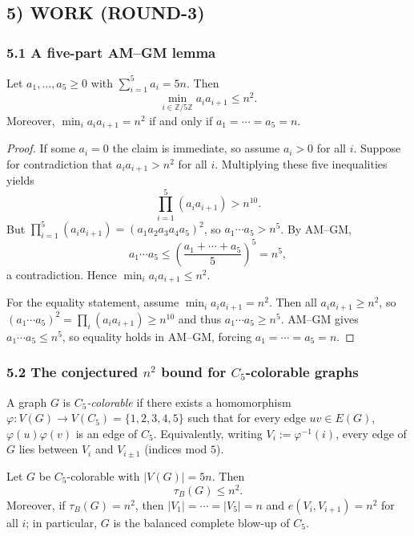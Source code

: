 \subsection*{5) WORK (ROUND-3)}

\subsubsection*{5.1 A five-part AM--GM lemma}
\begin{lemma}\label{lem:adjprod}
Let $a_1,\dots,a_5\ge 0$ with $\sum_{i=1}^5 a_i=5n$. Then
\[
\min_{i\in \mathbb Z/5\mathbb Z} a_i a_{i+1} \le n^2.
\]
Moreover, $\min_i a_i a_{i+1}=n^2$ if and only if $a_1=\cdots=a_5=n$.
\end{lemma}

\begin{proof}
If some $a_i=0$ the claim is immediate, so assume $a_i>0$ for all $i$.
Suppose for contradiction that $a_i a_{i+1}>n^2$ for all $i$.
Multiplying these five inequalities yields
\[
\prod_{i=1}^5 (a_i a_{i+1})>n^{10}.
\]
But $\prod_{i=1}^5 (a_i a_{i+1})=(a_1a_2a_3a_4a_5)^2$, so $a_1\cdots a_5>n^5$.
By AM--GM,
\[
a_1\cdots a_5 \le \left(\frac{a_1+\cdots+a_5}{5}\right)^5=n^5,
\]
a contradiction. Hence $\min_i a_i a_{i+1}\le n^2$.

For the equality statement, assume $\min_i a_i a_{i+1}=n^2$.
Then all $a_i a_{i+1}\ge n^2$, so
$(a_1\cdots a_5)^2=\prod_i (a_i a_{i+1})\ge n^{10}$ and thus $a_1\cdots a_5\ge n^5$.
AM--GM gives $a_1\cdots a_5\le n^5$, so equality holds in AM--GM,
forcing $a_1=\cdots=a_5=n$.
\end{proof}

\subsubsection*{5.2 The conjectured $n^2$ bound for $C_5$-colorable graphs}
\begin{definition}
A graph $G$ is \emph{$C_5$-colorable} if there exists a homomorphism
$\varphi:V(G)\to V(C_5)=\{1,2,3,4,5\}$ such that for every edge $uv\in E(G)$,
$\varphi(u)\varphi(v)$ is an edge of $C_5$.
Equivalently, writing $V_i:=\varphi^{-1}(i)$, every edge of $G$ lies between
$V_i$ and $V_{i\pm 1}$ (indices mod $5$).
\end{definition}

\begin{theorem}\label{thm:C5colorable}
Let $G$ be $C_5$-colorable with $|V(G)|=5n$. Then
\[
\tau_B(G)\le n^2.
\]
Moreover, if $\tau_B(G)=n^2$, then $|V_1|=\cdots=|V_5|=n$ and
$e(V_i,V_{i+1})=n^2$ for all $i$; in particular, $G$ is the balanced complete
blow-up of $C_5$.
\end{theorem}

